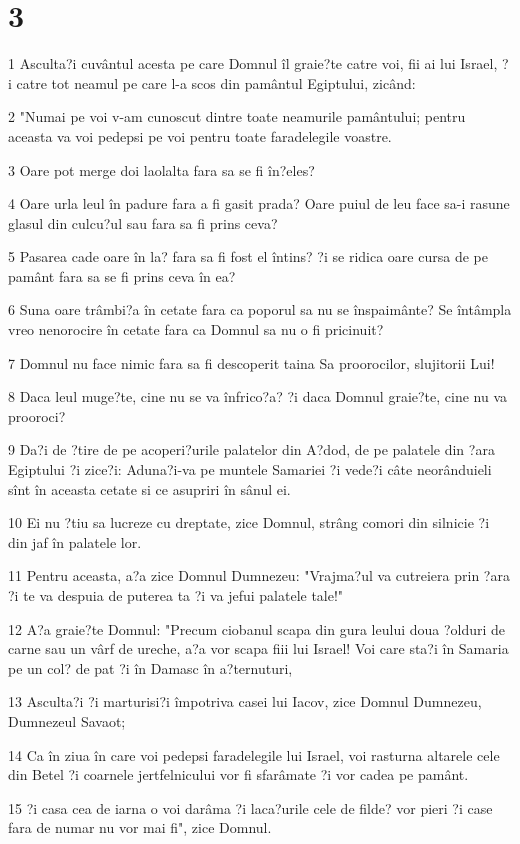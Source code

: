 \chapter{3}

\par 1 Asculta?i cuvântul acesta pe care Domnul îl graie?te catre voi, fii ai lui Israel, ?i catre tot neamul pe care l-a scos din pamântul Egiptului, zicând:
\par 2 "Numai pe voi v-am cunoscut dintre toate neamurile pamântului; pentru aceasta va voi pedepsi pe voi pentru toate faradelegile voastre.
\par 3 Oare pot merge doi laolalta fara sa se fi în?eles?
\par 4 Oare urla leul în padure fara a fi gasit prada? Oare puiul de leu face sa-i rasune glasul din culcu?ul sau fara sa fi prins ceva?
\par 5 Pasarea cade oare în la? fara sa fi fost el întins? ?i se ridica oare cursa de pe pamânt fara sa se fi prins ceva în ea?
\par 6 Suna oare trâmbi?a în cetate fara ca poporul sa nu se înspaimânte? Se întâmpla vreo nenorocire în cetate fara ca Domnul sa nu o fi pricinuit?
\par 7 Domnul nu face nimic fara sa fi descoperit taina Sa proorocilor, slujitorii Lui!
\par 8 Daca leul muge?te, cine nu se va înfrico?a? ?i daca Domnul graie?te, cine nu va prooroci?
\par 9 Da?i de ?tire de pe acoperi?urile palatelor din A?dod, de pe palatele din ?ara Egiptului ?i zice?i: Aduna?i-va pe muntele Samariei ?i vede?i câte neorânduieli sînt în aceasta cetate si ce asupriri în sânul ei.
\par 10 Ei nu ?tiu sa lucreze cu dreptate, zice Domnul, strâng comori din silnicie ?i din jaf în palatele lor.
\par 11 Pentru aceasta, a?a zice Domnul Dumnezeu: "Vrajma?ul va cutreiera prin ?ara ?i te va despuia de puterea ta ?i va jefui palatele tale!"
\par 12 A?a graie?te Domnul: "Precum ciobanul scapa din gura leului doua ?olduri de carne sau un vârf de ureche, a?a vor scapa fiii lui Israel! Voi care sta?i în Samaria pe un col? de pat ?i în Damasc în a?ternuturi,
\par 13 Asculta?i ?i marturisi?i împotriva casei lui Iacov, zice Domnul Dumnezeu, Dumnezeul Savaot;
\par 14 Ca în ziua în care voi pedepsi faradelegile lui Israel, voi rasturna altarele cele din Betel ?i coarnele jertfelnicului vor fi sfarâmate ?i vor cadea pe pamânt.
\par 15 ?i casa cea de iarna o voi darâma ?i laca?urile cele de filde? vor pieri ?i case fara de numar nu vor mai fi", zice Domnul.

